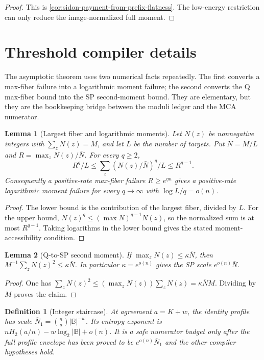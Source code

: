\documentclass[12pt,a4paper]{amsart}
\numberwithin{equation}{section}
\newtheorem{lemma}[lemma]{Lemma}
\newtheorem{definition}[definition]{Definition}
\theoremstyle{remark}
\newcommand{\B}{\mathbb B}
\newcommand{\barN}{\overline N}
\newcommand{\Hb}{H_2}
\newcommand{\abs}[1]{\lvert #1\rvert}
\begin{document}
\begin{proof}
This is \cref{cor:sidon-payment-from-prefix-flatness}.  The low-energy
restriction can only reduce the image-normalized full moment.
\end{proof}

\section{Threshold compiler details}\label{sec:threshold-details}

The asymptotic theorem uses two numerical facts repeatedly.  The first converts a max-fiber failure into a logarithmic moment failure; the second converts the Q max-fiber bound into the SP second-moment bound.  They are elementary, but they are the bookkeeping bridge between the moduli ledger and the MCA numerator.

\begin{lemma}[Largest fiber and logarithmic moments]\label{lem:largest-fiber-log-detail}
Let \(N(z)\) be nonnegative integers with \(\sum_zN(z)=M\), and let \(L\) be the number of targets.  Put \(\bar N=M/L\) and \(R=\max_z N(z)/\bar N\).  For every \(q\ge2\),
\[
        R^{q}/L\le \sum_z (N(z)/\bar N)^q/L\le R^{q-1}.
\]
Consequently a positive-rate max-fiber failure \(R\ge e^{\eta n}\) gives a positive-rate logarithmic moment failure for every \(q\to\infty\) with \(\log L/q=o(n)\).
\end{lemma}

\begin{proof}
The lower bound is the contribution of the largest fiber, divided by
\(L\).  For the upper bound,
\(N(z)^q\le(\max N)^{q-1}N(z)\), so the normalized sum is at most
\(R^{q-1}\).  Taking logarithms in the lower bound gives the stated
moment-accessibility condition.
\end{proof}

\begin{lemma}[Q-to-SP second moment]\label{lem:q-to-sp-detail}
If \(\max_z N(z)\le \kappa\bar N\), then \(M^{-1}\sum_zN(z)^2\le\kappa\bar N\).  In particular \(\kappa=e^{o(n)}\) gives the SP scale \(e^{o(n)}\bar N\).
\end{lemma}

\begin{proof}
One has \(\sum_zN(z)^2\le(\max_zN(z))\sum_zN(z)=\kappa\bar N M\).  Dividing by \(M\) proves the claim.
\end{proof}

\begin{definition}[Integer staircase]\label{def:integer-staircase-detail}
At agreement \(a=K+w\), the identity profile has scale
\(\barN_1=\binom na\abs\B^{-w}\).  Its entropy exponent is
\(n\Hb(a/n)-w\log_2\abs\B+o(n)\).  It is a safe numerator budget only
after the full profile envelope has been proved to be
\(e^{o(n)}\barN_1\) and the other compiler hypotheses hold.
\end{definition}
\end{document}
